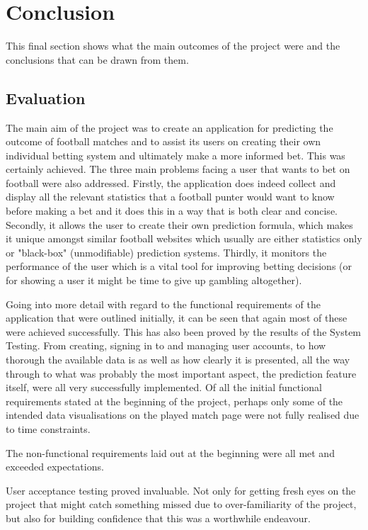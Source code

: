 \chapter{Conclusion}
\label{ch:conclusion}
This final section shows what the main outcomes of the project were and the conclusions that can be drawn from them.

\section{Evaluation}
\label{sec:evaluation_conclusion} 
The main aim of the project was to create an application for predicting the outcome of football matches and to assist its users on creating their own individual betting system and ultimately make a more informed bet. This was certainly achieved. The three main problems facing a user that wants to bet on football were also addressed. Firstly, the application does indeed collect and display all the relevant statistics that a football punter would want to know before making a bet and it does this in a way that is both clear and concise. Secondly, it allows the user to create their own prediction formula, which makes it unique amongst similar football websites which usually are either statistics only or "black-box" (unmodifiable) prediction systems. Thirdly, it monitors the performance of the user which is a vital tool for improving betting decisions (or for showing a user it might be time to give up gambling altogether).

Going into more detail with regard to the functional requirements of the application that were outlined initially, it can be seen that again most of these were achieved successfully.  This has also been proved by the results of the System Testing. From creating, signing in to and managing user accounts, to how thorough the available data is as well as how clearly it is presented, all the way through to what was probably the most important aspect, the prediction feature itself, were all very successfully implemented. Of all the initial functional requirements stated at the beginning of the project, perhaps only some of the intended data visualisations on the played match page were not fully realised due to time constraints.

The non-functional requirements laid out at the beginning were all met and exceeded expectations. 

User acceptance testing proved invaluable.  Not only for getting fresh eyes on the project that might catch something missed due to over-familiarity of the project, but also for building confidence that this was a worthwhile endeavour.

